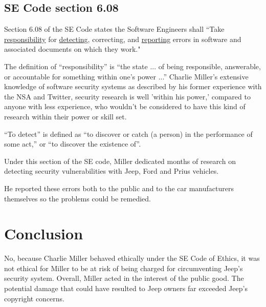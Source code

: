 \documentclass[12pt]{article}
\begin{document}
\begin{multicols}{2}
\subsection{SE Code section 6.08}

Section 6.08 of the SE Code states the Software Engineers shall ``Take \underline{responsibility} for \underline{detecting}, correcting, and \underline{reporting} errors in software and associated documents on which they work."\cite{seCode}

The definition of ``responsibility'' is ``the state ... of being responsible, answerable, or accountable for something within one's power ...''\cite{dictionary}
Charlie Miller's extensive knowledge of software security systems as described by his former experience with the NSA and Twitter\cite{linkedin}, security research is well 'within his power,' compared to anyone with less experience, who wouldn't be considered to have this kind of research within their power or skill set.

``To detect'' is defined as ``to discover or catch (a person) in the performance of some act,''\cite{dictionary} or ``to discover the existence of''\cite{dictionary}. 

Under this section of the SE code, Miller dedicated months of research on detecting security vulnerabilities with Jeep, Ford and Prius vehicles.

He reported these errors both to the public and to the car manufacturers themselves so the problems could be remedied. 

\section{Conclusion}

No, because Charlie Miller behaved ethically under the SE Code of Ethics, it was not ethical for Miller to be at risk of being charged for circumventing Jeep's security system. Overall, Miller acted in the interest of the public good. The potential damage that could have resulted to Jeep owners far exceeded Jeep's copyright concerns.

\end{multicols}

\nocite{*}



\newpage

\end{document}
